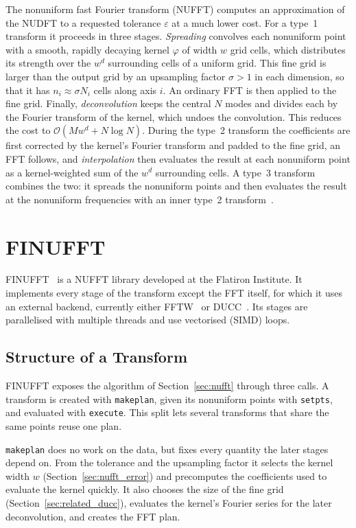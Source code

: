 The nonuniform fast Fourier transform (NUFFT) computes an approximation of
the NUDFT to a requested tolerance $\varepsilon$ at a much lower cost. For a
type~1 transform it proceeds in three stages. \emph{Spreading} convolves each
nonuniform point with a smooth, rapidly decaying kernel $\varphi$ of width $w$
grid cells, which distributes its strength over the $w^d$ surrounding cells of
a uniform grid. This fine grid is larger than the output grid by an
upsampling factor $\sigma > 1$ in each dimension, so that it has
$n_i \approx \sigma N_i$ cells along axis $i$. An ordinary FFT is then applied
to the fine grid. Finally, \emph{deconvolution} keeps the central $N$ modes
and divides each by the Fourier transform of the kernel, which undoes the
convolution. This reduces the cost to $\mathcal{O}(M w^d + N \log N)$. During the 
type~2 transform the coefficients are first
corrected by the kernel's Fourier transform and padded to the fine grid, an
FFT follows, and \emph{interpolation} then evaluates the result at each
nonuniform point as a kernel-weighted sum of the $w^d$ surrounding cells. A
type~3 transform combines the two: it spreads the nonuniform points and then
evaluates the result at the nonuniform frequencies with an inner type~2
transform~\cite{barnett2019}.

\section{FINUFFT}
\label{sec:finufft_intro}

FINUFFT~\cite{barnett2019,finufftsoftware} is a NUFFT library developed at the
Flatiron Institute. It implements every stage of the transform except the FFT
itself, for which it uses an external backend, currently either
FFTW~\cite{frigo2005} or DUCC~\cite{ducc}. Its stages are parallelised with
multiple threads and use vectorised (SIMD) loops.

\subsection{Structure of a Transform}
\label{sec:transform_structure}

FINUFFT exposes the algorithm of Section~\ref{sec:nufft} through three calls. A
transform is created with \texttt{makeplan}, given its nonuniform points with
\texttt{setpts}, and evaluated with \texttt{execute}. This split lets several
transforms that share the same points reuse one plan.

\texttt{makeplan} does no work on the data, but fixes every quantity the later
stages depend on. From the tolerance and the upsampling factor it selects the
kernel width $w$ (Section~\ref{sec:nufft_error}) and precomputes the
coefficients used to evaluate the kernel quickly. It also chooses the size of
the fine grid (Section~\ref{sec:related_ducc}), evaluates the kernel's Fourier
series for the later deconvolution, and creates the FFT plan.

